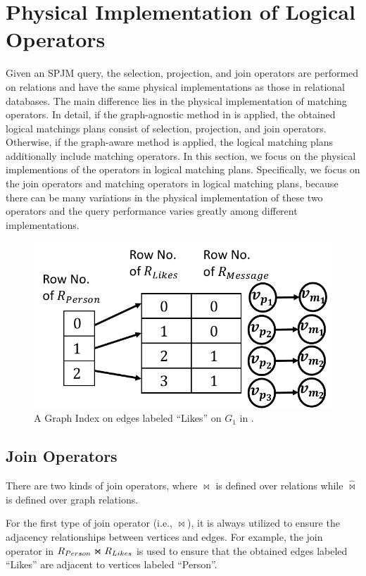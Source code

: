\section{Physical Implementation of Logical Operators}

Given an SPJM query, the selection, projection, and join operators are performed on relations and have the same physical implementations as those in relational databases.
The main difference lies in the physical implementation of matching operators.
In detail, if the graph-agnostic method in  is applied, the obtained logical matchings plans consist of selection, projection, and join operators.
Otherwise, if the graph-aware method is applied, the logical matching plans additionally include matching operators.
In this section, we focus on the physical implementions of the operators in logical matching plans.
Specifically, we focus on the join operators and matching operators in logical matching plans, because there can be many variations in the physical implementation of these two operators and the query performance varies greatly among different implementations. 

\begin{figure}
    \centering
    \includegraphics[width=.8\linewidth]{./figures/graph-index-likes.pdf}
    \caption{A Graph Index on edges labeled ``Likes'' on $G_1$ in .}
    \label{fig:graph-index}
\end{figure}

\subsection{Join Operators}
\label{sec:join-operator}
There are two kinds of join operators, where $\Join$ is defined over relations while $\widehat{\Join}$ is defined over graph relations.

For the first type of join operator (i.e., $\Join$), it is always utilized to ensure the adjacency relationships between vertices and edges.
For example, the join operator in ${R_{Person}} \Join {\ensuremath R_{Likes}}$ is used to ensure that the obtained edges labeled ``Likes'' are adjacent to vertices labeled ``Person''.

